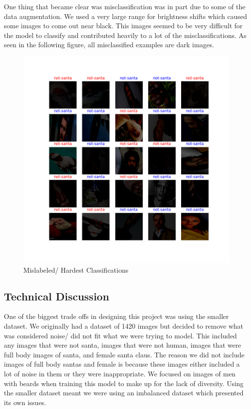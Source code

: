 One thing that became clear was misclassification was in part due to some of the data augmentation. We used a very large range for brightness shifts which caused some images to come out near black. 
This images seemed to be very difficult for the model to classify and contributed heavily to a lot of the misclassifications. As seen in the following figure, all misclassified examples are dark images.
\begin{figure}[h]
    \centering
    \includegraphics[width=0.70\linewidth]{img/imageData-4.png}
    \caption{Mislabeled/ Hardest Classifications}
    \label{fig:result2}
\end{figure}

\subsection{Technical Discussion}

One of the biggest trade offs in designing this project was using the smaller dataset. 
We originally had a dataset of 1420 images but decided to remove what was considered noise/ did not fit what we were trying to model. 
This included any images that were not santa, images that were not human, images that were full body images of santa, and female santa claus. 
The reason we did not include images of full body santas and female is because these images either included a lot of noise in them or they were inappropriate. 
We focused on images of men with beards when training this model to make up for the lack of diversity. 
Using the smaller dataset meant we were using an imbalanced dataset which presented its own issues.



